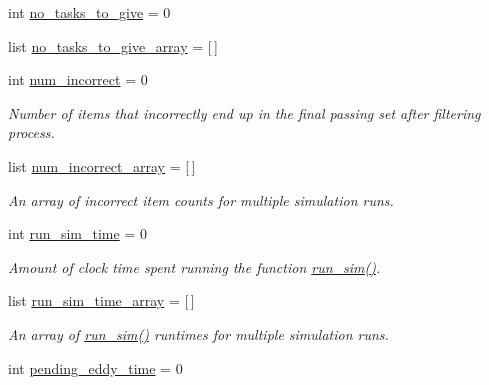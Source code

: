 \begin{DoxyCompactItemize}
int \mbox{\hyperlink{classdynamicfilterapp_1_1test__simulations_1_1_simulation_test_a50859596b592ecea7447a51ab83209d1}{no\+\_\+tasks\+\_\+to\+\_\+give}} = 0
\item 
list \mbox{\hyperlink{classdynamicfilterapp_1_1test__simulations_1_1_simulation_test_aca05845f48ed602774413566dcbed8ee}{no\+\_\+tasks\+\_\+to\+\_\+give\+\_\+array}} = \mbox{[}$\,$\mbox{]}
\item 
int \mbox{\hyperlink{classdynamicfilterapp_1_1test__simulations_1_1_simulation_test_ac8f769f7a743d3c6bb9e29cdc01a67b1}{num\+\_\+incorrect}} = 0
\begin{DoxyCompactList}\small\item\em Number of items that incorrectly end up in the final passing set after filtering process. \end{DoxyCompactList}\item 
list \mbox{\hyperlink{classdynamicfilterapp_1_1test__simulations_1_1_simulation_test_ae04fa3a990d11de4cda2e4d61a4d4756}{num\+\_\+incorrect\+\_\+array}} = \mbox{[}$\,$\mbox{]}
\begin{DoxyCompactList}\small\item\em An array of incorrect item counts for multiple simulation runs. \end{DoxyCompactList}\item 
int \mbox{\hyperlink{classdynamicfilterapp_1_1test__simulations_1_1_simulation_test_a3ef3670fbfd221b5d98a34fceba93c19}{run\+\_\+sim\+\_\+time}} = 0
\begin{DoxyCompactList}\small\item\em Amount of clock time spent running the function \mbox{\hyperlink{classdynamicfilterapp_1_1test__simulations_1_1_simulation_test_aafbc405f49645141a30302a448b056dc}{run\+\_\+sim()}}. \end{DoxyCompactList}\item 
list \mbox{\hyperlink{classdynamicfilterapp_1_1test__simulations_1_1_simulation_test_a26bec4b04005dffaddd57bdcd42249f3}{run\+\_\+sim\+\_\+time\+\_\+array}} = \mbox{[}$\,$\mbox{]}
\begin{DoxyCompactList}\small\item\em An array of \mbox{\hyperlink{classdynamicfilterapp_1_1test__simulations_1_1_simulation_test_aafbc405f49645141a30302a448b056dc}{run\+\_\+sim()}} runtimes for multiple simulation runs. \end{DoxyCompactList}\item 
int \mbox{\hyperlink{classdynamicfilterapp_1_1test__simulations_1_1_simulation_test_a059ceb58f40a64c850d6a7e78752145b}{pending\+\_\+eddy\+\_\+time}} = 0

\end{DoxyCompactItemize}
